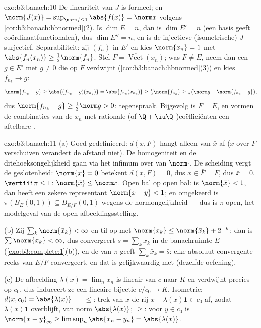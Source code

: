 \begin{solution}{exo:b3:banach:10}
De lineariteit van $J$ is formeel; en $\norm{J(x)} = \sup_{\norm
f \leq 1}\abs{f(x)} = \norm x$ volgens
\cref{cor:b3:banach:hbnormed}(2). Is $\dim E = n$, dan is $\dim
E' = n$ (een basis geeft coördinaatfunctionalen), dus $\dim E'' =
n$, en is de injectieve (isometrische) $J$ surjectief.
Separabiliteit: zij $(f_n)$  in $E'$ en kies $\norm{x_n} = 1$
met $\abs{f_n(x_n)} \geq \frac12\norm{f_n}$. Stel $F =
\overline{\operatorname{Vect}}(x_n)$; was $F \neq E$, neem dan een
$g \in E'$ met $g \neq 0$ die op $F$ verdwijnt
(\cref{cor:b3:banach:hbnormed}(3)) en kies $f_{n_k} \to g$:
\[
\norm{f_{n_k} - g} \geq \abs{(f_{n_k} - g)(x_{n_k})}
= \abs{f_{n_k}(x_{n_k})} \geq \tfrac12\norm{f_{n_k}}
\geq \tfrac12\bigl(\norm g - \norm{f_{n_k} - g}\bigr),
\]
dus $\norm{f_{n_k} - g} \geq \frac13\norm g > 0$: tegenspraak.
Bijgevolg is $F = E$, en vormen de combinaties van de $x_n$ met
rationale (of $\Q + \iu\Q$-)coëfficiënten een aftelbare .
\end{solution}

\begin{solution}{exo:b3:banach:11}
(a) Goed gedefinieerd: $d(x, F)$ hangt alleen van $\bar x$ af
($x$ over $F$ verschuiven verandert de afstand niet). De
homogeniteit en de driehoeksongelijkheid gaan via het infimum
over van $\norm\cdot$. De scheiding vergt de geslotenheid:
$\norm{\bar x} = 0$ betekent $d(x, F) = 0$, dus $x \in \bar F =
F$, dus $\bar x = 0$. $\vertiii\pi \leq 1$: $\norm{\bar x} \leq
\norm x$. Open bal op open bal: is $\norm{\bar x} < 1$, dan heeft
een zekere representant $\norm{x - y} < 1$; en omgekeerd is
$\pi(B_E(0,1)) \subseteq B_{E/F}(0,1)$ wegens de normongelijkheid
--- dus is $\pi$ open, het modelgeval van de
open-afbeeldingsstelling.

(b) Zij $\sum_k\norm{\bar x_k} < \infty$ en til op met
$\norm{x_k} \leq \norm{\bar x_k} + 2^{-k}$: dan is
$\sum\norm{x_k} < \infty$, dus convergeert $s = \sum_kx_k$ in de
banachruimte $E$ (\cref{exo:b3:complete:1}(b)), en de
 van $\pi$ geeft $\sum_k\bar x_k = \bar s$: elke
absoluut convergente reeks van $E/F$ convergeert, en dat is
gelijkwaardig met  (dezelfde oefening).

(c) De afbeelding $\lambda(x) = \lim_nx_n$ is lineair van $c$
naar $K$ en verdwijnt precies op $c_0$, dus induceert ze een
lineaire bijectie $c/c_0 \to K$. Isometrie: $d(x, c_0) =
\abs{\lambda(x)}$ --- $\leq$: trek van $x$ de rij $x -
\lambda(x)\mathbf 1 \in c_0$ af, zodat $\lambda(x)\mathbf 1$
overblijft, van norm $\abs{\lambda(x)}$; $\geq$: voor $y \in c_0$
is $\norm{x - y}_\infty \geq \limsup_n\abs{x_n - y_n} =
\abs{\lambda(x)}$.
\end{solution}

